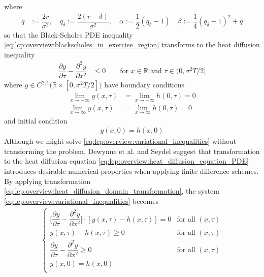 where
\begin{align}
  \label{eq:lcp:overview:heat_diffusion_domain_transformation_2}
  q &:= \dfrac{2r}{\sigma^2}, \quad q_{\delta} := \dfrac{2(r-\delta)}{\sigma^2}, \quad \alpha := \dfrac{1}{2}(q_{\delta} - 1) \quad \beta := \dfrac{1}{4}(q_{\delta} - 1)^2 + q 
\end{align}
so that the Black-Scholes PDE inequality \eqref{eq:lcp:overview:blackscholes_in_exercise_region} transforms to the heat diffusion inequality
\begin{align}
  \label{eq:lcp:overview:heat_diffusion_equation_PDE}
  \dfrac{\partial{y}}{\partial{\tau}} - \dfrac{\partial^2{y}}{\partial{x^2}} &\le 0 \qquad \text{for $x \in \mathbb{R}$ and $\tau\in(0, \sigma^2T/2]$}
\end{align}
where $y\in C^{2,1}\big(\mathbb{R}\times[0, \sigma^2T/2]\big)$ have boundary conditions
\begin{align}
  \lim_{x\rightarrow-\infty}y(x, \tau) &= \lim_{x\rightarrow-\infty}h(0, \tau)  = 0 \\
  \lim_{x\rightarrow\infty}y(x, \tau) &= \lim_{x\rightarrow\infty}h(0, \tau) = 0
\end{align}
and initial condition 
\begin{align}
  y(x, 0) = h(x, 0)
\end{align}
Although we might solve \eqref{eq:lcp:overview:variational_inequalities} without transforming the problem, Dewynne et al.\cite{dewynne_howison_rupf_wilmott_1993} and Seydel\cite{seydel_2009} suggest that transformation to the heat diffusion equation \eqref{eq:lcp:overview:heat_diffusion_equation_PDE} introduces desirable numerical properties when applying finite difference schemes. By applying transformation \eqref{eq:lcp:overview:heat_diffusion_domain_transformation}, the system \eqref{eq:lcp:overview:variational_inequalities} becomes
\begin{align}
  \begin{cases}
    \bigg[\dfrac{\partial{y}}{\partial{\tau}} - \dfrac{\partial^2{y}}{\partial{x^2}}\bigg] \cdot [y(x, \tau) - h(x, \tau)] = 0 & \text{for all $(x,\tau)$} \\
    y(x, \tau) - h(x, \tau) \ge 0 & \text{for all $(x, \tau)$}\\
    \dfrac{\partial{y}}{\partial{\tau}} - \dfrac{\partial^2{y}}{\partial{x^2}} \ge 0 &  \text{for all $(x, \tau)$}\\
    y(x, 0) = h(x, 0) \\  
  \end{cases}
  \label{eq:lcp:overview:variational_inequalities_heat_equation}
\end{align}
